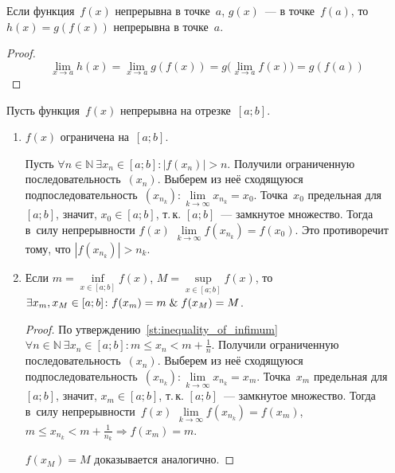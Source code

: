 \begin{statement}
Если функция~$f(x)$ непрерывна в точке~$a$, $g(x)$~--- в точке~$f(a)$, то $h(x) = g(f(x))$ непрерывна в точке~$a$.
\end{statement}
\begin{proof}
\begin{equation*}
\lim_{x \to a} h(x) = \lim_{x \to a} g(f(x)) = g \bigl( \lim_{x \to a} f(x) \bigr) = g(f(a))
\end{equation*}
\end{proof}

Пусть функция~$f(x)$ непрерывна на отрезке~$[a; b]$.
\begin{enumerate}
	\item $f(x)$ ограничена на~$[a; b]$.
	\begin{proofcontra}
	Пусть $\forall n \in \mathbb N \ \exists x_n \in [a; b] \colon |f(x_n)| > n$.
	Получили ограниченную последовательность~$(x_n)$.
	Выберем из неё сходящуюся подпоследовательность~$(x_{n_k}) \colon \lim\limits_{k \to \infty} x_{n_k} = x_0$.
	Точка~$x_0$ предельная для~$[a; b]$, значит, $x_0 \in [a; b]$, т.\,к. $[a; b]$~--- замкнутое множество.
	Тогда в~силу непрерывности $f(x)$ $\lim\limits_{k \to \infty} f(x_{n_k}) = f(x_0)$.
	Это противоречит тому, что $|f(x_{n_k})| > n_k$.
	\end{proofcontra}
	
	\item \label{st:continuous_function_takes_inf_and_sup} Если $m = \inf\limits_{x \in [a; b]} f(x)$, $M = \sup\limits_{x \in [a; b]} f(x)$, то
	$\exists x_m, x_M \in [a; b] \colon f(x_m) = m \mathrel{\&} f(x_M) = M$.
	\begin{proof}
	По утверждению~\ref{st:inequality_of_infimum} $\forall n \in \mathbb N \ \exists x_n \in [a; b] \colon m \leqslant x_n < m + \frac1n$.
	Получили ограниченную последовательность~$(x_n)$.
	Выберем из неё сходящуюся подпоследовательность~$(x_{n_k}) \colon \lim\limits_{k \to \infty} x_{n_k} = x_m$.
	Точка~$x_m$ предельная для~$[a; b]$, значит, $x_m \in [a; b]$, т.\,к. $[a; b]$~--- замкнутое множество.
	Тогда в~силу непрерывности~$f(x)$ $\lim\limits_{k \to \infty} f(x_{n_k}) = f(x_m)$, $m \leqslant x_{n_k} < m + \frac1{n_k} \Rightarrow f(x_m) = m$.
	
	$f(x_M) = M$ доказывается аналогично.
	\end{proof}
	

\end{enumerate}
